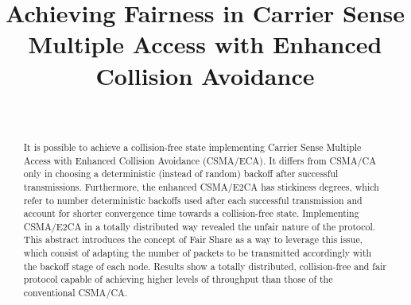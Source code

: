 \documentclass[conference]{IEEEtran}
\begin{document}
 \title{Achieving Fairness in Carrier Sense Multiple Access with Enhanced Collision Avoidance}


  \author{
      \\
  }



\maketitle

\begin{abstract}

\boldmath It is possible to achieve a collision-free state implementing Carrier Sense Multiple Access with Enhanced Collision Avoidance (CSMA/ECA). It differs from CSMA/CA only in choosing a deterministic (instead of random) backoff after successful transmissions. Furthermore, the enhanced CSMA/E2CA has stickiness degrees, which refer to number deterministic backoffs used after each successful transmission and account for shorter convergence time towards a collision-free state. Implementing CSMA/E2CA in a totally distributed way revealed the unfair nature of the protocol. This abstract introduces the concept of Fair Share as a way to leverage this issue, which consist of adapting the number of packets to be transmitted accordingly with the backoff stage of each node. Results show a totally distributed, collision-free and fair protocol capable of achieving higher levels of throughput than those of the conventional CSMA/CA.

\end{abstract}
\end{document}

